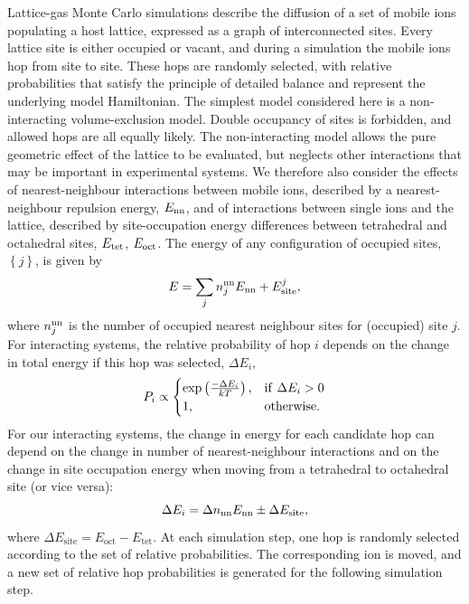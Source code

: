 \documentclass[aps,prb,twocolumn,superscriptaddress,reprint]{revtex4-1}
\newcommand{\set}[1]{\left\{#1\right\}}
\begin{document}
Lattice-gas Monte Carlo simulations describe the diffusion of a set of mobile ions populating a host lattice, expressed as a graph of interconnected sites.\cite{Trudeau_GraphTheoryBook} 
Every lattice site is either occupied or vacant, and during a simulation the mobile ions hop from site to site. 
These hops are randomly selected, with relative probabilities that satisfy the principle of detailed balance and represent the underlying model Hamiltonian. 
The simplest model considered here is a non-interacting volume-exclusion model.\cite{Kutner_PhysLett1981} Double occupancy of sites is forbidden, and allowed hops are all equally likely. 
The non-interacting model allows the pure geometric effect of the lattice to be evaluated, but neglects other interactions that may be important in experimental systems. 
We therefore also consider the effects of nearest-neighbour interactions between mobile ions, described by a nearest-neighbour repulsion energy, $E_{\mathrm{nn}}$, and of interactions between single ions and the lattice, described by site-occupation energy differences between tetrahedral and octahedral sites, $E_{\mathrm{tet}}$, $E_{\mathrm{oct}}$. 
The energy of any configuration of occupied sites, $\set{j}$, is given by
\begin{equation}
  E = \sum_j n_j^{\mathrm{nn}}E_{\mathrm{nn}} + E_{\mathrm{site}}^j,
\end{equation}
where $n^{\mathrm{nn}}_j$ is the number of occupied nearest neighbour sites for (occupied) site $j$. 
For interacting systems, the relative probability of hop $i$ depends on the change in total energy if this hop was selected, $\Delta E_i$,
\begin{equation}
  P_i \propto 
  \begin{cases}
    \mathrm{exp}\left(\frac{-\Delta E_i}{kT}\right),& \mathrm{if}\,\,\Delta E_i > 0 \\
    1,                                        & \mathrm{otherwise.}
  \end{cases}
\end{equation}
For our interacting systems, the change in energy for each candidate hop can depend on the change in number of nearest-neighbour interactions and on the change in site occupation energy when moving from a tetrahedral to octahedral site (or vice versa):
\begin{equation}
  \Delta E_i = \Delta n_{\mathrm{nn}}E_{\mathrm{nn}} \pm \Delta E_{\mathrm{site}},
\end{equation}
where $\Delta E_\mathrm{site}=E_\mathrm{oct}-E_\mathrm{tet}$.
At each simulation step, one hop is randomly selected according to the set of relative probabilities. 
The corresponding ion is moved, and a new set of relative hop probabilities is generated for the following simulation step.
\end{document}
